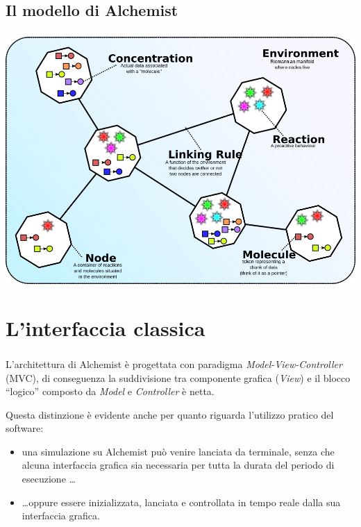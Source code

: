 \documentclass[%
]{beamer}
\newcommand{\engEmph}[1] {\emph{\foreignlanguage{english}#1}}
\begin{document}
    \subsection{Il modello di Alchemist}\label{subsec:alchModel}
    \begin{frame}
        \frametitle{\insertsection}
        \framesubtitle{\insertsubsection}

        \centering
        \includegraphics[scale=.34]{fig/alchemist_model}
    \end{frame}

    \begin{frame}
        \frametitle{\insertsection}
        \framesubtitle{\insertsubsection}

    \end{frame}

    \section{L'interfaccia classica}\label{sec:old}
    \begin{frame}
        \frametitle{\insertsection}
        L'architettura di Alchemist è progettata con paradigma \engEmph{Model-View-Controller} (MVC), di conseguenza la suddivisione tra componente grafica (\engEmph{View}) e il blocco ``logico'' composto da \engEmph{Model} e \engEmph{Controller} è netta.

        \medskip
        \pause

        Questa distinzione è evidente anche per quanto riguarda l'utilizzo pratico del software:

        \begin{itemize}[<+(1)->]
          \item
              una simulazione su Alchemist può venire lanciata da terminale, senza che alcuna interfaccia grafica sia necessaria per tutta la durata del periodo di esecuzione \ldots

          \item
              \ldots oppure essere inizializzata, lanciata e controllata in tempo reale dalla sua interfaccia grafica.
        \end{itemize}
    \end{frame}
\end{document}
